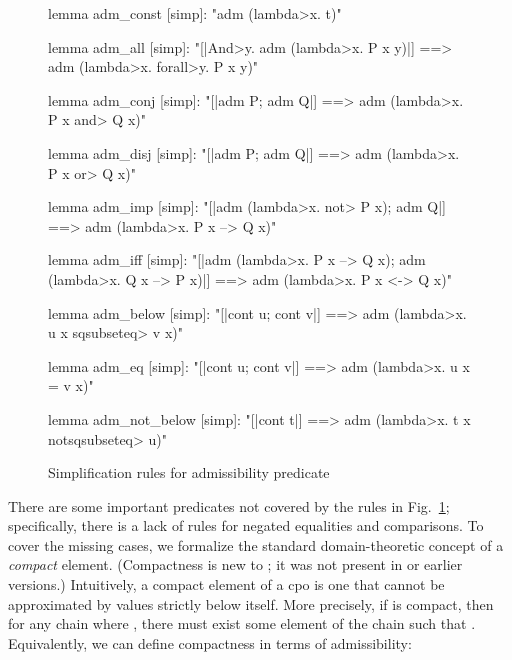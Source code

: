 \begin{figure}
\begin{isacode}
lemma adm_const [simp]: "adm (\<lambda>x. t)"
\end{isacode}
\unmedskip
{}
\begin{isacode}
lemma adm_all [simp]: "[|\<And>y. adm (\<lambda>x. P x y)|] ==> adm (\<lambda>x. \<forall>y. P x y)"
\end{isacode}
\unmedskip
{}
\begin{isacode}
lemma adm_conj [simp]: "[|adm P; adm Q|] ==> adm (\<lambda>x. P x \<and> Q x)"
\end{isacode}
\unmedskip
{}
\begin{isacode}
lemma adm_disj [simp]: "[|adm P; adm Q|] ==> adm (\<lambda>x. P x \<or> Q x)"
\end{isacode}
\unmedskip
{}
\begin{isacode}
lemma adm_imp [simp]: "[|adm (\<lambda>x. \<not> P x); adm Q|] ==> adm (\<lambda>x. P x --> Q x)"
\end{isacode}
\unmedskip
{}
\begin{isacode}
lemma adm_iff [simp]:
  "[|adm (\<lambda>x. P x --> Q x); adm (\<lambda>x. Q x --> P x)|] ==> adm (\<lambda>x. P x <-> Q x)"
\end{isacode}
\unmedskip
{}
\begin{isacode}
lemma adm_below [simp]: "[|cont u; cont v|] ==> adm (\<lambda>x. u x \<sqsubseteq> v x)"
\end{isacode}
\unmedskip
{}
\begin{isacode}
lemma adm_eq [simp]: "[|cont u; cont v|] ==> adm (\<lambda>x. u x = v x)"
\end{isacode}
\unmedskip
{}
\begin{isacode}
lemma adm_not_below [simp]: "[|cont t|] ==> adm (\<lambda>x. t x \<notsqsubseteq> u)"
\end{isacode}
\caption{Simplification rules for admissibility predicate}
\label{fig:holcf-adm-simps}
\end{figure}

There are some important predicates not covered by the rules in Fig.~\ref{fig:holcf-adm-simps}; specifically, there is a lack of rules for negated equalities and comparisons. To cover the missing cases, we formalize the standard domain-theoretic concept of a \emph{compact} element. (Compactness is new to ; it was not present in  or earlier versions.) Intuitively, a compact element of a cpo is one that cannot be approximated by values strictly below itself. More precisely, if  is compact, then for any chain  where , there must exist some element of the chain such that . Equivalently, we can define compactness in terms of admissibility:

